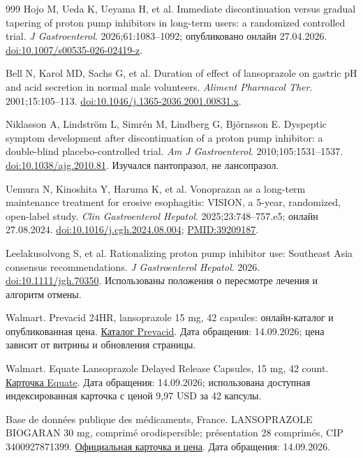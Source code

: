 \documentclass[11pt,a4paper,notitlepage]{report}
\begin{document}
\begin{thebibliography}{999}
 Hojo M, Ueda K, Ueyama H, et al. Immediate discontinuation versus gradual tapering of proton pump inhibitors in long-term users: a randomized controlled trial. \textit{J Gastroenterol}. 2026;61:1083--1092; опубликовано онлайн 27.04.2026. \href{https://doi.org/10.1007/s00535-026-02419-z}{doi:10.1007/s00535-026-02419-z}.


 Bell N, Karol MD, Sachs G, et al. Duration of effect of lansoprazole on gastric pH and acid secretion in normal male volunteers. \textit{Aliment Pharmacol Ther}. 2001;15:105--113. \href{https://doi.org/10.1046/j.1365-2036.2001.00831.x}{doi:10.1046/j.1365-2036.2001.00831.x}.

 Niklasson A, Lindström L, Simrén M, Lindberg G, Björnsson E. Dyspeptic symptom development after discontinuation of a proton pump inhibitor: a double-blind placebo-controlled trial. \textit{Am J Gastroenterol}. 2010;105:1531--1537. \href{https://doi.org/10.1038/ajg.2010.81}{doi:10.1038/ajg.2010.81}. Изучался пантопразол, не лансопразол.

 Uemura N, Kinoshita Y, Haruma K, et al. Vonoprazan as a long-term maintenance treatment for erosive esophagitis: VISION, a 5-year, randomized, open-label study. \textit{Clin Gastroenterol Hepatol}. 2025;23:748--757.e5; онлайн 27.08.2024. \href{https://doi.org/10.1016/j.cgh.2024.08.004}{doi:10.1016/j.cgh.2024.08.004}; \href{https://pubmed.ncbi.nlm.nih.gov/39209187/}{PMID:39209187}.

 Leelakusolvong S, et al. Rationalizing proton pump inhibitor use: Southeast Asia consensus recommendations. \textit{J Gastroenterol Hepatol}. 2026. \href{https://doi.org/10.1111/jgh.70350}{doi:10.1111/jgh.70350}. Использованы положения о пересмотре лечения и алгоритм отмены.

 Walmart. Prevacid 24HR, lansoprazole 15 mg, 42 capsules: онлайн-каталог и опубликованная цена. \href{https://www.walmart.com/browse/health-and-medicine/prevacid/976760_1396434_7324505_5124400}{Каталог Prevacid}. Дата обращения: 14.09.2026; цена зависит от витрины и обновления страницы.

 Walmart. Equate Lansoprazole Delayed Release Capsules, 15 mg, 42 count. \href{https://www.walmart.com/ip/907145156}{Карточка Equate}. Дата обращения: 14.09.2026; использована доступная индексированная карточка с ценой 9,97 USD за 42 капсулы.

 Base de données publique des médicaments, France. LANSOPRAZOLE BIOGARAN 30 mg, comprimé orodispersible; présentation 28 comprimés, CIP 3400927871399. \href{https://base-donnees-publique.medicaments.gouv.fr/medicament/63062321/extrait}{Официальная карточка и цена}. Дата обращения: 14.09.2026.


\end{thebibliography}
\end{document}
